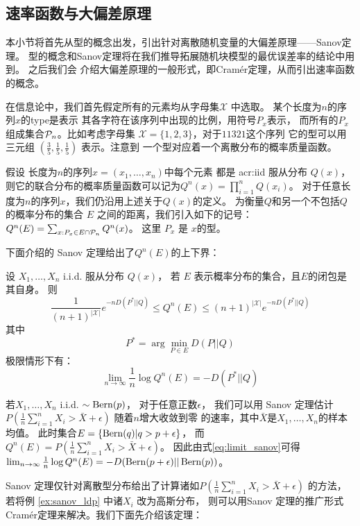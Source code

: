 \subsection{速率函数与大偏差原理}
本小节将首先从型的概念出发，引出针对离散随机变量的大偏差原理——Sanov定理。
型的概念和Sanov定理将在我们推导拓展随机块模型的最优误差率的结论中用到。
之后我们会
介绍大偏差原理的一般形式，即Cramér定理，从而引出速率函数的概念。

在信息论中，我们首先假定所有的元素均从字母集$\mathcal{X}$
中选取。
某个长度为$n$的序列$x$的\gls{type}是表示
其各字符在该序列中出现的比例，用符号$P_x$表示，
而所有的$P_x$组成集合$\P_n$。比如考虑字母集
$\mathcal{X}=\{1,2,3\}$，对于$11321$这个序列
它的型可以用三元组 $(\frac{3}{5}, 
\frac{1}{5}, \frac{1}{5})$ 表示。注意到
一个型对应着一个离散分布的概率质量函数。

假设 长度为$n$的序列$x=(x_1,\dots, x_n)$中每个元素 都是 \gls{acr:iid} 
服从分布 $Q(x)$，
则它的联合分布的概率质量函数可以记为$Q^n(x)=\prod_{i=1}^n Q(x_i)$。
对于任意长度为$n$的序列$x$，我们仍沿用上述关于$Q(x)$的定义。
为衡量$Q$和另一个不包括$Q$的概率分布的集合 $E$ 之间的距离，我们引入如下的记号：
$Q^n(E) = \sum_{x: P_x \in E \cap \P_n} Q^n(x)$。
这里 $P_x$ 是 $x$的型。

下面介绍的 Sanov 定理给出了$Q^n(E)$的上下界：
\begin{theorem}
  设 $X_1, \dots, X_n$ i.i.d. 服从分布 $Q(x)$，
  若 $E$ 表示概率分布的集合，且$E$的闭包是其自身。
  则
  \begin{equation}
  \frac{1}{(n+1)^{|\mathcal{X}|}} e^{-n D(P^*||Q)}
  \leq Q^n(E) \leq (n+1)^{|\mathcal{X}|} e^{-n D(P^*||Q)}
  \end{equation}
  其中
  \begin{equation}
    P^* = \arg\min_{P\in E} D(P||Q)
  \end{equation}
  极限情形下有：
  \begin{equation}\label{eq:limit_sanov}
    \lim_{n\to \infty} \frac{1}{n} \log Q^n(E) = -D(P^*||Q)
  \end{equation}
\end{theorem}
\begin{example}\label{ex:sanov_ldp}
若$X_1, \dots, X_n$ i.i.d. $\sim \Bern(p)$，
对于任意正数$\epsilon$，
我们可以用 Sanov 定理估计 $P(\frac{1}{n} \sum_{i=1}^n X_i > \bar{X} + \epsilon)$ 随着$n$增大收敛到零
的速率，其中$\bar{X}$是$X_1,\dots, X_n$的样本均值。
此时集合$E=\{\Bern(q)| q>p+\epsilon\}$，
而$Q^n(E)=P(\frac{1}{n} \sum_{i=1}^n X_i > \bar{X} + \epsilon)$。
因此由式\eqref{eq:limit_sanov}可得
$\lim_{n\to \infty} \frac{1}{n} \log Q^n(E)=-D(\Bern(p+\epsilon)||\Bern(p))$。
\end{example}
Sanov 定理仅针对离散型分布给出了计算诸如$P(\frac{1}{n} \sum_{i=1}^n X_i > \bar{X} + \epsilon)$
的方法，若将例 \ref{ex:sanov_ldp} 中诸$X_i$ 改为高斯分布，
则可以用Sanov 定理的推广形式 Cramér定理来解决。我们下面先介绍该定理：

